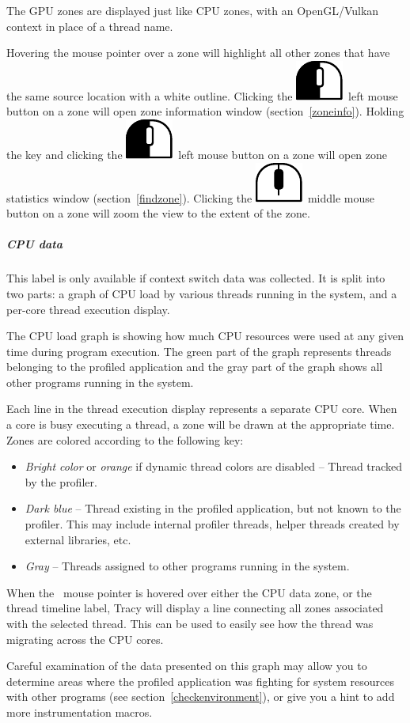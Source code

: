 \documentclass[hidelinks,titlepage,a4paper]{article}
\newcommand{\LMB}{\includegraphics[height=.8\baselineskip]{icons/lmb}}
\newcommand{\MMB}{\includegraphics[height=.8\baselineskip]{icons/mmb}}
\begin{document}
The GPU zones are displayed just like CPU zones, with an OpenGL/Vulkan context in place of a thread name.

Hovering the \faMousePointer{} mouse pointer over a zone will highlight all other zones that have the same source location with a white outline. Clicking the \LMB{}~left mouse button on a zone will open zone information window (section~\ref{zoneinfo}). Holding the \keys{\ctrl} key and clicking the \LMB{}~left mouse button on a zone will open zone statistics window (section~\ref{findzone}). Clicking the \MMB{}~middle mouse button on a zone will zoom the view to the extent of the zone.

\subparagraph{CPU data}

This label is only available if context switch data was collected. It is split into two parts: a graph of CPU load by various threads running in the system, and a per-core thread execution display.

The CPU load graph is showing how much CPU resources were used at any given time during program execution. The green part of the graph represents threads belonging to the profiled application and the gray part of the graph shows all other programs running in the system.

Each line in the thread execution display represents a separate CPU core. When a core is busy executing a thread, a zone will be drawn at the appropriate time. Zones are colored according to the following key:

\begin{itemize}
\item \emph{Bright color} or \emph{orange} if dynamic thread colors are disabled -- Thread tracked by the profiler.
\item \emph{Dark blue} -- Thread existing in the profiled application, but not known to the profiler. This may include internal profiler threads, helper threads created by external libraries, etc.
\item \emph{Gray} -- Threads assigned to other programs running in the system.
\end{itemize}

When the \faMousePointer{}~mouse pointer is hovered over either the CPU data zone, or the thread timeline label, Tracy will display a line connecting all zones associated with the selected thread. This can be used to easily see how the thread was migrating across the CPU cores.

Careful examination of the data presented on this graph may allow you to determine areas where the profiled application was fighting for system resources with other programs (see section~\ref{checkenvironment}), or give you a hint to add more instrumentation macros.
\end{document}
